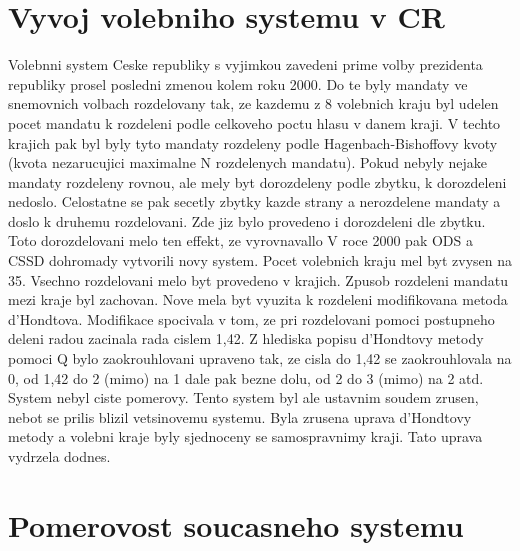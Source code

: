 \documentclass[12pt,a4paper]{article}
\begin{document}
\section{Vyvoj volebniho systemu v CR}
Volebnni system Ceske republiky s vyjimkou zavedeni prime volby prezidenta republiky prosel posledni zmenou kolem roku 2000.
Do te byly mandaty ve snemovnich volbach rozdelovany tak, ze kazdemu z 8 volebnich kraju byl udelen pocet mandatu k rozdeleni podle celkoveho poctu hlasu v danem kraji.
V techto krajich pak byl byly tyto mandaty rozdeleny podle Hagenbach-Bishoffovy kvoty (kvota nezarucujici maximalne N rozdelenych mandatu).
Pokud nebyly nejake mandaty rozdeleny rovnou, ale mely byt dorozdeleny podle zbytku, k dorozdeleni nedoslo.
Celostatne se pak secetly zbytky kazde strany a nerozdelene mandaty a doslo k druhemu rozdelovani.
Zde jiz bylo provedeno i dorozdeleni dle zbytku.
Toto dorozdelovani melo ten effekt, ze vyrovnavallo %
V roce 2000 pak ODS a CSSD dohromady vytvorili novy system.
Pocet volebnich kraju mel byt zvysen na 35.
Vsechno rozdelovani melo byt provedeno v krajich.
Zpusob rozdeleni mandatu mezi kraje byl zachovan.
Nove mela byt vyuzita k rozdeleni modifikovana metoda d'Hondtova.
Modifikace spocivala v tom, ze pri rozdelovani pomoci postupneho deleni radou zacinala rada cislem 1,42.
Z hlediska popisu d'Hondtovy metody pomoci Q bylo zaokrouhlovani upraveno tak, ze cisla do 1,42 se zaokrouhlovala na 0, od 1,42 do 2 (mimo) na 1 dale pak bezne dolu, od 2 do 3 (mimo) na 2 atd.
System nebyl ciste pomerovy.
Tento system byl ale ustavnim soudem zrusen, nebot se prilis blizil vetsinovemu systemu. \autocite{SOU}
Byla zrusena uprava d'Hondtovy metody a volebni kraje byly sjednoceny se samospravnimy kraji.
Tato uprava vydrzela dodnes.

\section{Pomerovost soucasneho systemu}
      
\printbibliography 
\end{document}
